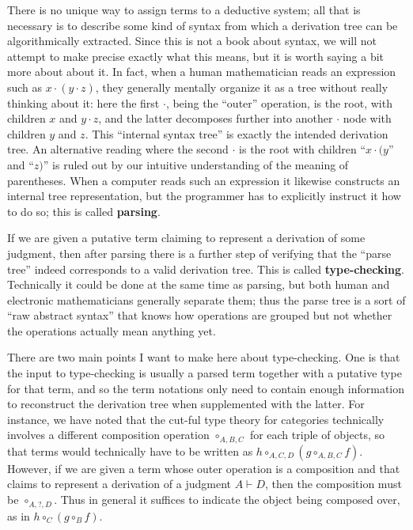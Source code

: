 \documentclass{book}
\let\types\vdash
\begin{document}
There is no unique way to assign terms to a deductive system; all that is necessary is to describe some kind of syntax from which a derivation tree can be algorithmically extracted.
Since this is not a book about syntax, we will not attempt to make precise exactly what this means, but it is worth saying a bit more about about it.
In fact, when a human mathematician reads an expression such as $x\cdot (y\cdot z)$, they generally mentally organize it as a tree without really thinking about it: here the first $\cdot$, being the ``outer'' operation, is the root, with children $x$ and $y\cdot z$, and the latter decomposes further into another $\cdot$ node with children $y$ and $z$.
This ``internal syntax tree'' is exactly the intended derivation tree.
An alternative reading where the second $\cdot$ is the root with children ``$x\cdot (y$'' and ``$z)$'' is ruled out by our intuitive understanding of the meaning of parentheses.
When a computer reads such an expression it likewise constructs an internal tree representation, but the programmer has to explicitly instruct it how to do so; this is called \textbf{parsing}.

If we are given a putative term claiming to represent a derivation of some judgment, then after parsing there is a further step of verifying that the ``parse tree'' indeed corresponds to a valid derivation tree.
This is called \textbf{type-checking}.
Technically it could be done at the same time as parsing, but both human and electronic mathematicians generally separate them; thus the parse tree is a sort of ``raw abstract syntax'' that knows how operations are grouped but not whether the operations actually mean anything yet.

There are two main points I want to make here about type-checking.
One is that the input to type-checking is usually a parsed term together with a putative type for that term, and so the term notations only need to contain enough information to reconstruct the derivation tree when supplemented with the latter.
For instance, we have noted that the cut-ful type theory for categories technically involves a different composition operation $\circ_{A,B,C}$ for each triple of objects, so that terms would technically have to be written as $h\circ_{A,C,D} (g\circ_{A,B,C} f)$.
However, if we are given a term whose outer operation is a composition and that claims to represent a derivation of a judgment $A\types D$, then the composition must be $\circ_{A,?,D}$.
Thus in general it suffices to indicate the object being composed over, as in $h\circ_C (g\circ_B f)$.
\end{document}
